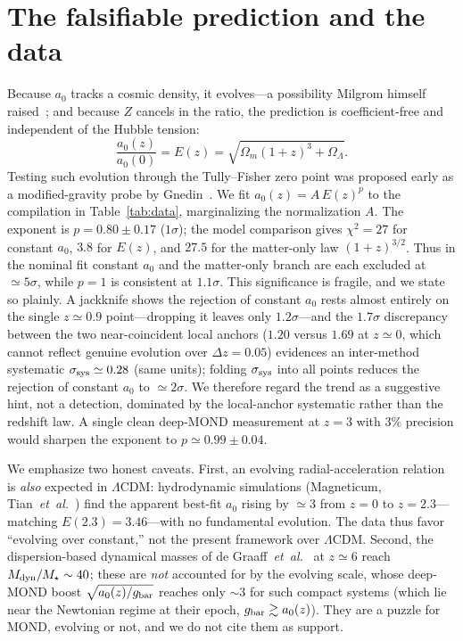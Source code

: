 \documentclass[aps,prd,preprint,nofootinbib,floatfix]{revtex4-2}
\begin{document}
\section{The falsifiable prediction and the data}
\label{sec:data}
Because $a_0$ tracks a cosmic density, it evolves---a possibility Milgrom himself
raised~\cite{Milgrom2014}; and because $Z$ cancels in the ratio, the prediction is
coefficient-free and independent of the Hubble tension:
\begin{equation}
\frac{a_0(z)}{a_0(0)}=E(z)=\sqrt{\Omega_m(1+z)^3+\Omega_\Lambda}.
\label{eq:Ez}
\end{equation}
Testing such evolution through the Tully--Fisher zero point was proposed early
as a modified-gravity probe by Gnedin~\cite{Gnedin2008}.
We fit $a_0(z)=A\,E(z)^p$ to the compilation in Table~\ref{tab:data},
marginalizing the normalization $A$. The exponent is $p=0.80\pm0.17$ ($1\sigma$);
the model comparison gives $\chi^2=27$ for constant $a_0$, $3.8$ for $E(z)$, and
$27.5$ for the matter-only law $(1+z)^{3/2}$. Thus in the nominal fit constant $a_0$ and the
matter-only branch are each excluded at $\simeq5\sigma$, while $p=1$ is consistent
at $1.1\sigma$. This significance is fragile, and we state so plainly. A jackknife
shows the rejection of constant $a_0$ rests almost entirely on the single
$z\simeq0.9$ point---dropping it leaves only $1.2\sigma$---and the $1.7\sigma$
discrepancy between the two near-coincident local anchors ($1.20$ versus $1.69$ at
$z\simeq0$, which cannot reflect genuine evolution over $\Delta z=0.05$) evidences an
inter-method systematic $\sigma_{\rm sys}\simeq0.28$ (same units); folding
$\sigma_{\rm sys}$ into all points reduces the rejection of constant $a_0$ to
$\simeq2\sigma$. We therefore regard the trend as a suggestive hint, not a detection,
dominated by the local-anchor systematic rather than the redshift law. A single clean
deep-MOND measurement at $z=3$ with $3\%$ precision would sharpen the exponent to
$p\simeq0.99\pm0.04$.

We emphasize two honest caveats. First, an evolving radial-acceleration relation is
{\it also} expected in $\Lambda$CDM: hydrodynamic simulations (Magneticum,
Tian~\textit{et~al.}~\cite{Tian2022}) find the apparent best-fit $a_0$ rising by
$\simeq3$ from $z=0$ to $z=2.3$---matching $E(2.3)=3.46$---with no fundamental
evolution. The data thus favor ``evolving over constant,'' not the present framework
over $\Lambda$CDM. Second, the dispersion-based dynamical masses of de
Graaff~\textit{et~al.}~\cite{deGraaff2024} at $z\simeq6$ reach $M_{\rm dyn}/M_\star\sim40$;
these are {\it not} accounted for by the evolving scale, whose deep-MOND boost
$\sqrt{a_0(z)/g_{\rm bar}}$ reaches only $\sim3$ for such compact systems (which lie
near the Newtonian regime at their epoch, $g_{\rm bar}\gtrsim a_0(z)$). They are a
puzzle for MOND, evolving or not, and we do not cite them as support.
\end{document}
